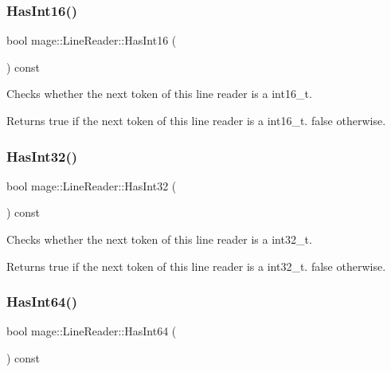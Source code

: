 \subsubsection{\texorpdfstring{Has\+Int16()}{HasInt16()}}
{\footnotesize\ttfamily bool mage\+::\+Line\+Reader\+::\+Has\+Int16 (\begin{DoxyParamCaption}{ }\end{DoxyParamCaption}) const\hspace{0.3cm}{\ttfamily [protected]}}

Checks whether the next token of this line reader is a {\ttfamily int16\+\_\+t}.

\begin{DoxyReturn}{Returns}
{\ttfamily true} if the next token of this line reader is a {\ttfamily int16\+\_\+t}. {\ttfamily false} otherwise. 
\end{DoxyReturn}
\hypertarget{classmage_1_1_line_reader_af8402b39637e27877eac2909604bbf89}{}\label{classmage_1_1_line_reader_af8402b39637e27877eac2909604bbf89} 
\subsubsection{\texorpdfstring{Has\+Int32()}{HasInt32()}}
{\footnotesize\ttfamily bool mage\+::\+Line\+Reader\+::\+Has\+Int32 (\begin{DoxyParamCaption}{ }\end{DoxyParamCaption}) const\hspace{0.3cm}{\ttfamily [protected]}}

Checks whether the next token of this line reader is a {\ttfamily int32\+\_\+t}.

\begin{DoxyReturn}{Returns}
{\ttfamily true} if the next token of this line reader is a {\ttfamily int32\+\_\+t}. {\ttfamily false} otherwise. 
\end{DoxyReturn}
\hypertarget{classmage_1_1_line_reader_a3a7883e24fb3108a79ecda4eaac983f2}{}\label{classmage_1_1_line_reader_a3a7883e24fb3108a79ecda4eaac983f2} 
\subsubsection{\texorpdfstring{Has\+Int64()}{HasInt64()}}
{\footnotesize\ttfamily bool mage\+::\+Line\+Reader\+::\+Has\+Int64 (\begin{DoxyParamCaption}{ }\end{DoxyParamCaption}) const\hspace{0.3cm}{\ttfamily [protected]}}

